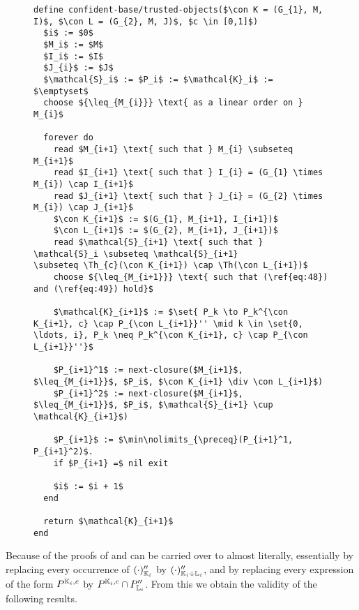 \begin{figure}[tp]
  \begin{Algorithm}
    \hspace*{0cm}
    \label{alg:confident-base/growing-attributes-trusted-objects}
    \begin{lstlisting}
define confident-base/trusted-objects($\con K = (G_{1}, M, I)$, $\con L = (G_{2}, M, J)$, $c \in [0,1]$)
  $i$ := $0$
  $M_i$ := $M$
  $I_i$ := $I$
  $J_{i}$ := $J$
  $\mathcal{S}_i$ := $P_i$ := $\mathcal{K}_i$ := $\emptyset$
  choose ${\leq_{M_{i}}} \text{ as a linear order on } M_{i}$
  
  forever do
    read $M_{i+1} \text{ such that } M_{i} \subseteq M_{i+1}$
    read $I_{i+1} \text{ such that } I_{i} = (G_{1} \times M_{i}) \cap I_{i+1}$
    read $J_{i+1} \text{ such that } J_{i} = (G_{2} \times M_{i}) \cap J_{i+1}$
    $\con K_{i+1}$ := $(G_{1}, M_{i+1}, I_{i+1})$
    $\con L_{i+1}$ := $(G_{2}, M_{i+1}, J_{i+1})$
    read $\mathcal{S}_{i+1} \text{ such that } \mathcal{S}_i \subseteq \mathcal{S}_{i+1}
\subseteq \Th_{c}(\con K_{i+1}) \cap \Th(\con L_{i+1})$
    choose ${\leq_{M_{i+1}}} \text{ such that (\ref{eq:48}) and (\ref{eq:49}) hold}$

    $\mathcal{K}_{i+1}$ := $\set{ P_k \to P_k^{\con K_{i+1}, c} \cap P_{\con L_{i+1}}'' \mid k \in \set{0, \ldots, i}, P_k \neq P_k^{\con K_{i+1}, c} \cap P_{\con L_{i+1}}''}$

    $P_{i+1}^1$ := next-closure($M_{i+1}$, $\leq_{M_{i+1}}$, $P_i$, $\con K_{i+1} \div \con L_{i+1}$)
    $P_{i+1}^2$ := next-closure($M_{i+1}$, $\leq_{M_{i+1}}$, $P_i$, $\mathcal{S}_{i+1} \cup \mathcal{K}_{i+1}$)

    $P_{i+1}$ := $\min\nolimits_{\preceq}(P_{i+1}^1, P_{i+1}^2)$.
    if $P_{i+1} =$ nil exit

    $i$ := $i + 1$
  end

  return $\mathcal{K}_{i+1}$  
end
    \end{lstlisting}
  \end{Algorithm}
\end{figure}

Because of  the proofs of
 and
 can be carried over to
 almost literally, essentially
by replacing every occurrence of $(\cdot)_{{\mathbb{K}}_{i}}''$ by $(\cdot)_{{\mathbb{K}}_{i} \div
  {\ensuremath{\mathbb{L}}}_{i}}''$, and by replacing every expression of the form $P^{{\mathbb{K}}_{i}, c}$ by
$P^{{\mathbb{K}}_{i}, c} \cap P_{{\mathbb{L}}_{i}}''$.  From this we obtain the validity of the
following results.

